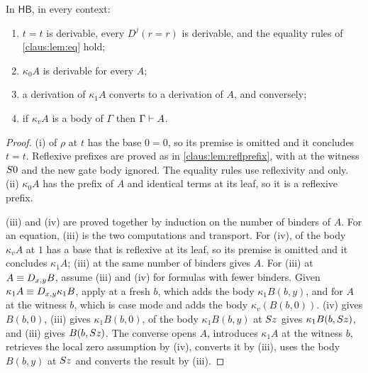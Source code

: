 \begin{lemma}
\label{claus:lem:retrieval}
In $\mathsf{HB}$, in every context:
\begin{enumerate}[label=(\roman*)]
\item $t=t$ is derivable, every $D^j(r=r)$ is derivable, and the equality
rules of \cref{claus:lem:eq} hold;
\item $\kappa_0A$ is derivable for every $A$;
\item a derivation of $\kappa_1A$ converts to a derivation of $A$, and
conversely;
\item if $\kappa_vA$ is a body of $\Gamma$ then $\Gamma\vdash A$.
\end{enumerate}
\end{lemma}
\begin{proof}
(i)  of $\rho$ at $t$ has the base $0=0$, so its premise is
omitted and it concludes $t=t$. Reflexive prefixes are proved as in
\cref{claus:lem:reflprefix}, with  at the witness
$S 0$ and the new gate body ignored. The equality rules use
reflexivity and  only. (ii) $\kappa_0A$ has the prefix of
$A$ and identical terms at its leaf, so it is a reflexive prefix.

(iii) and (iv) are proved together by induction on the number of binders
of $A$. For an equation, (iii) is the two computations and transport. For
(iv),  of the body $\kappa_vA$ at $1$ has a base that is
reflexive at its leaf, so its premise is omitted and it concludes
$\kappa_1A$; (iii) at the same number of binders gives $A$. For (iii) at
$A\equiv D_{x,y}B$, assume (iii) and (iv) for formulas with fewer binders.
Given $\kappa_1A\equiv D_{x,y}\kappa_1B$, apply  at a fresh
$b$, which adds the body $\kappa_1B(b,y)$, and  for $A$ at
the witness $b$, which is case mode and adds the body
$\kappa_v(B(b,0))$. (iv) gives $B(b,0)$, (iii) gives $\kappa_1B(b,0)$,
 of the body $\kappa_1B(b,y)$ at $S z$ gives
$\kappa_1B(b,S z)$, and (iii) gives $B(b,S z)$. The converse opens
$A$, introduces $\kappa_1A$ at the witness $b$, retrieves the local zero
assumption by (iv), converts it by (iii), uses the body $B(b,y)$ at
$S z$ and converts the result by (iii).
\end{proof}

